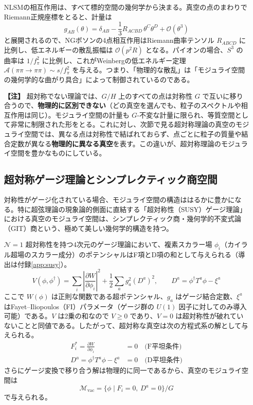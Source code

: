 \documentclass[uplatex, dvipdfmx, book]{jsbook}
\let\origsubsection\subsection
\let\origsubsubsection\subsubsection
\renewcommand{\section}{\origsubsection}
\renewcommand{\subsection}{\origsubsubsection}
\renewcommand{\subsubsection}{\paragraph}
\newenvironment{note}{\vspace{1ex}\par\footnotesize\noindent\textbf{【注】}}{\par\vspace{1ex}}
\begin{document}
NLSMの相互作用は、すべて標的空間の幾何学から決まる。真空の点のまわりでRiemann正規座標をとると、計量は
\begin{equation}
    g_{AB}(\theta) = \delta_{AB} - \frac{1}{3}R_{ACBD}\,\theta^C\theta^D + \mathcal{O}(\theta^3)
\end{equation}
と展開されるので、NGボソンの4点相互作用はRiemann曲率テンソル $R_{ABCD}$ に比例し、低エネルギーの散乱振幅は $\mathcal{O}(p^2 R)$ となる。パイオンの場合、$S^3$ の曲率は $1/f_\pi^2$ に比例し、これがWeinbergの低エネルギー定理 $\mathcal{A}(\pi\pi \to \pi\pi) \sim s/f_\pi^2$ を与える。つまり、「物理的な散乱」は「モジュライ空間の幾何学的な曲がり具合」によって制御されているのである。

\begin{note}
超対称でない理論では、$G/H$ 上のすべての点は対称性 $G$ で互いに移り合うので、\textbf{物理的に区別できない}（どの真空を選んでも、粒子のスペクトルや相互作用は同じ）。モジュライ空間の計量も $G$-不変な計量に限られ、等質空間として非常に制限された形をとる。これに対し、次節で見る超対称理論の真空のモジュライ空間では、異なる点は対称性で結ばれておらず、点ごとに粒子の質量や結合定数が異なる\textbf{物理的に異なる真空}を表す。この違いが、超対称理論のモジュライ空間を豊かなものにしている。
\end{note}

\section{超対称ゲージ理論とシンプレクティック商空間}
\label{sec:susy-vacua}

対称性がゲージ化されている場合、モジュライ空間の構造ははるかに豊かになる。特に超弦理論の現象論的側面に直結する「超対称性（SUSY）ゲージ理論」における真空のモジュライ空間は、シンプレクティック商・幾何学的不変式論（GIT）商という、極めて美しい幾何学的構造を持つ。

$\mathcal{N}=1$ 超対称性を持つ4次元のゲージ理論において、複素スカラー場 $\phi_i$（カイラル超場のスカラー成分）のポテンシャルはF項とD項の和として与えられる（導出は付録\ref{app:susy}）。
\begin{equation}
    V(\phi, \phi^\dagger) = \sum_i \left| \frac{\partial W}{\partial \phi_i} \right|^2 + \frac{1}{2} \sum_a g_a^2 (D^a)^2, \qquad D^a = \phi^\dagger T^a \phi - \xi^a
\end{equation}
ここで $W(\phi)$ は正則な関数である超ポテンシャル、$g_a$ はゲージ結合定数、$\xi^a$ はFayet--Iliopoulos（FI）パラメータ（ゲージ群の $U(1)$ 因子に対してのみ導入可能）である。$V$ は2乗の和なので $V \ge 0$ であり、$V = 0$ は超対称性が破れていないことと同値である。したがって、超対称な真空は次の方程式系の解として与えられる。
\begin{align}
    F_i^* = \frac{\partial W}{\partial \phi_i} &= 0 \quad \text{(F平坦条件)} \\
    D^a = \phi^\dagger T^a \phi - \xi^a &= 0 \quad \text{(D平坦条件)}
\end{align}
さらにゲージ変換で移り合う解は物理的に同一であるから、真空のモジュライ空間は
\begin{equation}
    \mathcal{M}_{\text{vac}} = \{ \phi \mid F_i = 0,\ D^a = 0 \} / G
    \label{eq:susy-moduli}
\end{equation}
で与えられる。
\end{document}
